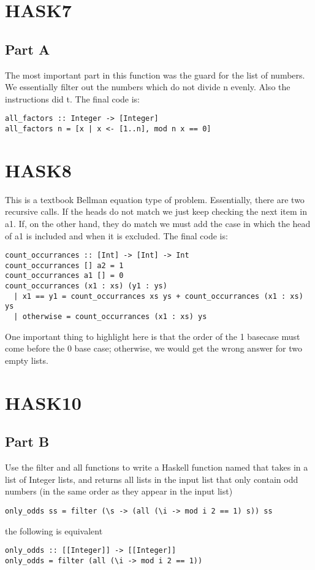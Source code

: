 \section*{HASK7}
\subsection*{Part A}
The most important part in this function was the guard for the list of
numbers. We essentially filter out the numbers which do not divide n
evenly. Also the instructions did t. The final code is:
\begin{verbatim}
all_factors :: Integer -> [Integer]
all_factors n = [x | x <- [1..n], mod n x == 0]
\end{verbatim}

\section*{HASK8}
This is a textbook Bellman equation type of problem. Essentially, there
are two recursive calls. If the heads do not match we just keep checking
the next item in a1. If, on the other hand, they do match we must add
the case in which the head of a1 is included and when it is excluded.
The final code is:
\begin{verbatim}
count_occurrances :: [Int] -> [Int] -> Int
count_occurrances [] a2 = 1
count_occurrances a1 [] = 0
count_occurrances (x1 : xs) (y1 : ys)
  | x1 == y1 = count_occurrances xs ys + count_occurrances (x1 : xs) ys
  | otherwise = count_occurrances (x1 : xs) ys  
\end{verbatim}
One important thing to highlight here is that the order of the 1
basecase must come before the 0 base case; otherwise, we would get the
wrong answer for two empty lists.

\section*{HASK10}
\subsection*{Part B}
Use the filter and all functions to write a Haskell function named
 that takes in a list of Integer lists, and returns
all lists in the input list that only contain odd numbers (in the same
order as they appear in the input list)
\begin{verbatim}
only_odds ss = filter (\s -> (all (\i -> mod i 2 == 1) s)) ss
\end{verbatim}
the following is equivalent
\begin{verbatim}
only_odds :: [[Integer]] -> [[Integer]]
only_odds = filter (all (\i -> mod i 2 == 1))
\end{verbatim}

